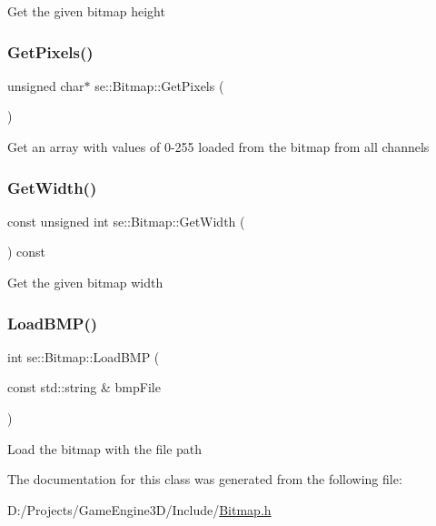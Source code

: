 Get the given bitmap height \mbox{\label{classse_1_1_bitmap_a7e0aa0d86804f241261c46307447a4f5}} 
\subsubsection{\texorpdfstring{Get\+Pixels()}{GetPixels()}}
{\footnotesize\ttfamily unsigned char$\ast$ se\+::\+Bitmap\+::\+Get\+Pixels (\begin{DoxyParamCaption}{ }\end{DoxyParamCaption})}

Get an array with values of 0-\/255 loaded from the bitmap from all channels \mbox{\label{classse_1_1_bitmap_adff193db6b52af590cad8f7200a83b6c}} 
\subsubsection{\texorpdfstring{Get\+Width()}{GetWidth()}}
{\footnotesize\ttfamily const unsigned int se\+::\+Bitmap\+::\+Get\+Width (\begin{DoxyParamCaption}{ }\end{DoxyParamCaption}) const}

Get the given bitmap width \mbox{\label{classse_1_1_bitmap_a76c7fbaf5d2049af44abf83fe40a854d}} 
\subsubsection{\texorpdfstring{Load\+B\+M\+P()}{LoadBMP()}}
{\footnotesize\ttfamily int se\+::\+Bitmap\+::\+Load\+B\+MP (\begin{DoxyParamCaption}\item[{const std\+::string \&}]{bmp\+File }\end{DoxyParamCaption})}

Load the bitmap with the file path 

The documentation for this class was generated from the following file\+:\begin{DoxyCompactItemize}
\item 
D\+:/\+Projects/\+Game\+Engine3\+D/\+Include/\mbox{\hyperlink{_bitmap_8h}{Bitmap.\+h}}\end{DoxyCompactItemize}
